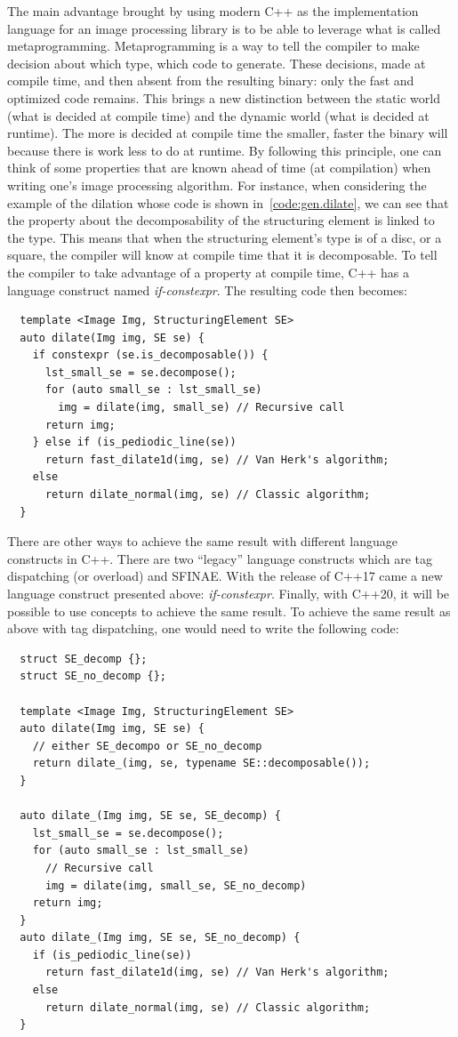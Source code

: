 The main advantage brought by using modern C++ as the implementation language for an image processing library is to be
able to leverage what is called metaprogramming. Metaprogramming is a way to tell the compiler to make decision about
which type, which code to generate. These decisions, made at compile time, and then absent from the resulting binary:
only the fast and optimized code remains. This brings a new distinction between the static world (what is decided at
compile time) and the dynamic world (what is decided at runtime). The more is decided at compile time the smaller,
faster the binary will because there is work less to do at runtime. By following this principle, one can think of some
properties that are known ahead of time (at compilation) when writing one's image processing algorithm. For instance,
when considering the example of the dilation whose code is shown in~\cref{code:gen.dilate}, we can see that the property
about the decomposability of the structuring element is linked to the type. This means that when the structuring
element's type is of a disc, or a square, the compiler will know at compile time that it is decomposable. To tell the
compiler to take advantage of a property at compile time, C++ has a language construct named \emph{if-constexpr}. The
resulting code then becomes:

\begin{verbatim}
  template <Image Img, StructuringElement SE>
  auto dilate(Img img, SE se) {
    if constexpr (se.is_decomposable()) {
      lst_small_se = se.decompose();
      for (auto small_se : lst_small_se)
        img = dilate(img, small_se) // Recursive call
      return img;
    } else if (is_pediodic_line(se))
      return fast_dilate1d(img, se) // Van Herk's algorithm;
    else
      return dilate_normal(img, se) // Classic algorithm;
  }
\end{verbatim}

There are other ways to achieve the same result with different language constructs in C++. There are two ``legacy''
language constructs which are tag dispatching (or overload) and SFINAE. With the release of C++17 came a new language
construct presented above: \emph{if-constexpr}. Finally, with C++20, it will be possible to use concepts to achieve the
same result. To achieve the same result as above with tag dispatching, one would need to write the following code:

\begin{verbatim}
  struct SE_decomp {};
  struct SE_no_decomp {};

  template <Image Img, StructuringElement SE>
  auto dilate(Img img, SE se) {
    // either SE_decompo or SE_no_decomp
    return dilate_(img, se, typename SE::decomposable());
  }

  auto dilate_(Img img, SE se, SE_decomp) {
    lst_small_se = se.decompose();
    for (auto small_se : lst_small_se)
      // Recursive call
      img = dilate(img, small_se, SE_no_decomp)
    return img;
  }
  auto dilate_(Img img, SE se, SE_no_decomp) {
    if (is_pediodic_line(se))
      return fast_dilate1d(img, se) // Van Herk's algorithm;
    else
      return dilate_normal(img, se) // Classic algorithm;
  }
\end{verbatim}

